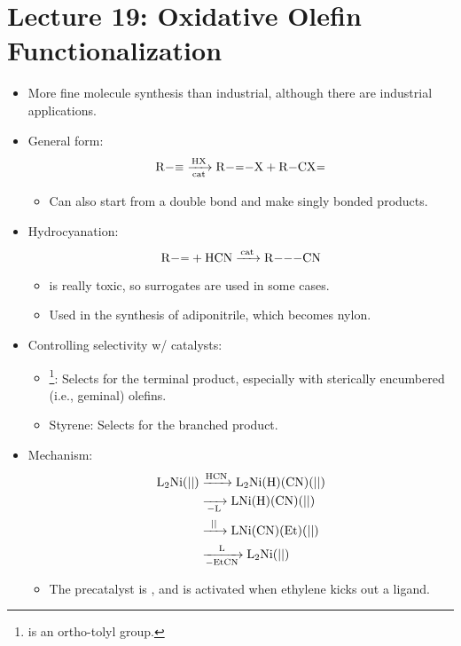 \documentclass[../notes.tex]{subfiles}
\begin{document}
\section{Lecture 19: Oxidative Olefin Functionalization}
\begin{itemize}
    \item {}More fine molecule synthesis than industrial, although there are industrial applications.
    \item General form:
    \begin{equation*}
        \ce{R-# ->[HX][{cat}] R-=-X + R-CX=}
    \end{equation*}
    \begin{itemize}
        \item Can also start from a double bond and make singly bonded products.
    \end{itemize}
    \item Hydrocyanation:
    \begin{equation*}
        \ce{R-= + HCN ->[{cat}] R---CN}
    \end{equation*}
    \begin{itemize}
        \item {} is really toxic, so surrogates are used in some cases.
        \item Used in the synthesis of adiponitrile, which becomes nylon.
    \end{itemize}
    \item Controlling selectivity w/ catalysts:
    \begin{itemize}
        \item {}\footnote{ is an ortho-tolyl group.}: Selects for the terminal product, especially with sterically encumbered (i.e., geminal) olefins.
        \item Styrene: Selects for the branched product.
    \end{itemize}
    \item Mechanism:
    \begin{align*}
        \ce{L_2Ni(||)} &\ce{->[HCN]} \ce{L_2Ni(H)(CN)(||)}\\
        &\ce{->[][-L]} \ce{LNi(H)(CN)(||)}\\
        &\ce{->[||]} \ce{LNi(CN)(Et)(||)}\\
        &\ce{->[L][-EtCN]} \ce{L2Ni(||)}
    \end{align*}
    \begin{itemize}
        \item The precatalyst is , and is activated when ethylene kicks out a ligand.

\end{itemize}
\end{itemize}
\end{document}
